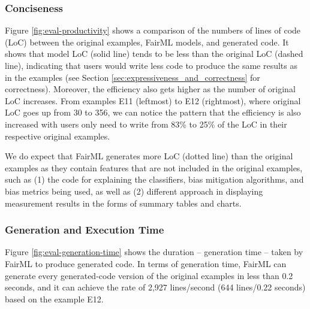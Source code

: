 \documentclass[sigconf]{acmart}
\begin{document}
{	%
	
	
	
	\subsubsection{Conciseness}
	\label{sec:productivity}
	
	Figure \ref{fig:eval-productivity} shows a comparison of the numbers of lines of code (LoC) between the original examples, FairML models, and generated code. It shows that model LoC (solid line) tends to be less than the original LoC (dashed line), indicating that users would write less code to produce the same results as in the examples (see Section \ref{sec:expressiveness_and_correctness} for correctness). Moreover, the efficiency also gets higher as the number of original LoC increases. From examples \textsf{E11} (leftmost) to \textsf{E12} (rightmost), where original LoC goes up from 30 to 356, we can notice the pattern that the efficiency is also increased with users only need to write from 83\% to 25\% of the LoC in their respective original examples.
	
	We do expect that FairML generates more LoC (dotted line) than the original examples as they contain features that are not included in the original examples, such as (1) the code for explaining the classifiers, bias mitigation algorithms, and bias metrics being used, as well as (2) different approach in displaying measurement results in the forms of summary tables and charts. 
	
	
	
	
	\subsubsection{Generation and Execution Time}
	\label{sec:execution_time}
	
	Figure \ref{fig:eval-generation-time} shows the duration -- generation time -- taken by FairML to produce generated code. 	
	In terms of generation time, 
	FairML can generate every generated-code version of the original examples in less than 0.2 seconds, 
	and it can achieve the rate of 2,927 lines/second (644 lines/0.22 seconds) based on the example E12. 
	
}
\end{document}
